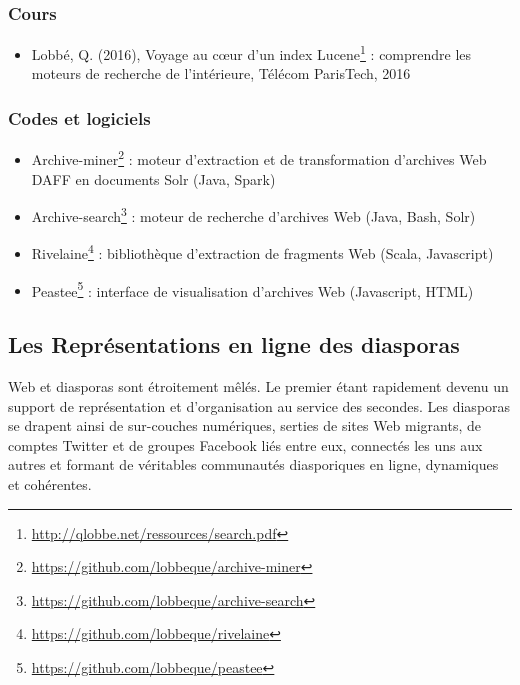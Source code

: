 \documentclass[symmetric,justified,marginals=raggedouter]{tufte-book}
\begin{document}
\subsection{Cours}

\begin{itemize}[leftmargin=*] 
\item Lobbé, Q. (2016), Voyage au cœur d'un index Lucene\footnote{\RaggedOuter \url{http://qlobbe.net/ressources/search.pdf}} : comprendre les moteurs de recherche de l'intérieure, Télécom ParisTech, 2016
\end{itemize}

\subsection{Codes et logiciels}

\begin{itemize}[leftmargin=*] 
\item Archive-miner\footnote{\RaggedOuter \url{https://github.com/lobbeque/archive-miner}} : moteur d'extraction et de transformation d'archives Web DAFF en documents Solr (Java, Spark) 
\item Archive-search\footnote{\RaggedOuter \url{https://github.com/lobbeque/archive-search}} : moteur de recherche d'archives Web (Java, Bash, Solr) 
\item Rivelaine\footnote{\RaggedOuter \url{https://github.com/lobbeque/rivelaine}} : bibliothèque d'extraction de fragments Web (Scala, Javascript)
\item Peastee\footnote{\RaggedOuter \url{https://github.com/lobbeque/peastee}} : interface de visualisation d'archives Web (Javascript, HTML) 
\end{itemize}


\cleardoublepage
\begin{minipage}[t,leftmargin=5em]{1.5\linewidth}%
\begin{adjustwidth}{-0.5cm}{}
\chapter{Les Représentations en ligne des diasporas} 
\label{chap:2}
\end{adjustwidth}
\end{minipage}
\hfill

\noindent Web et diasporas sont étroitement mêlés. Le premier étant rapidement devenu un support de représentation et d'organisation au service des secondes. Les diasporas se drapent ainsi de sur-couches numériques, serties de sites Web migrants, de comptes Twitter et de groupes Facebook liés entre eux, connectés les uns aux autres et formant de véritables communautés diasporiques en ligne, dynamiques et cohérentes. 
\end{document}
